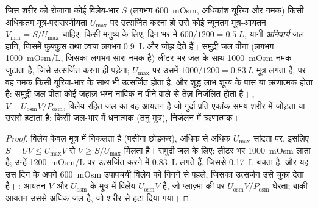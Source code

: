 \begin{proposition}[जल का अंकगणित]\label{prop:b3:renal-osmoregulation:water}
जिस शरीर को रोज़ाना कोई विलेय-भार $S$ (लगभग \qty{600}{mOsm}, अधिकांश
यूरिया और नमक) किसी अधिकतम मूत्र-परासरणीयता $U_{\max}$ पर उत्सर्जित
करना हो उसे कोई न्यूनतम मूत्र-आयतन $V_{\min} = S/U_{\max}$ चाहिए: किसी
मनुष्य के लिए, दिन भर में $600/1200 = \qty{0.5}{L}$, यानी
\emph{अनिवार्य} जल-हानि, जिसमें फुफ्फुस तथा त्वचा लगभग \qty{0.9}{L} और
जोड़ देते हैं। समुद्री जल पीना (लगभग \qty{1000}{mOsm/L}, जिसका लगभग
सारा नमक है) लीटर भर जल के साथ \qty{1000}{mOsm} नमक जुटाता है, जिसे
उत्सर्जित करना ही पड़ेगा; $U_{\max}$ पर उसमें
$1000/1200 = \qty{0.83}{L}$ मूत्र लगता है, पर वह नमक किसी यूरिया-भार के
साथ भी उत्सर्जित होता है, और शुद्ध लाभ शून्य के पास या ऋणात्मक होता है:
समुद्री जल पीता कोई जहाज़-भग्न नाविक न पीने वाले से तेज़ निर्जलित होता
है। \emph{}, $V - U_{\text{osm}}V/P_{\text{osm}}$,
विलेय-रहित जल का वह आयतन है जो गुर्दा प्रति एकांक समय शरीर में जोड़ता
या उससे हटाता है: किसी जल-भार में धनात्मक (तनु मूत्र), निर्जलन में
ऋणात्मक।
\end{proposition}
\begin{proof}
विलेय केवल मूत्र में निकलता है (पसीना छोड़कर), अधिक से अधिक
$U_{\max}$ सांद्रता पर, इसलिए $S = U V \le U_{\max}V$ से
$V \ge S/U_{\max}$ मिलता है। समुद्री जल के लिए: लीटर भर
\qty{1000}{mOsm} लाता है; उन्हें \qty{1200}{mOsm/L} पर उत्सर्जित करने
में \qty{0.83}{L} लगते हैं, जिससे \qty{0.17}{L} बचता है, और यह उस दिन
के अपने \qty{600}{mOsm} उपापचयी विलेय को गिनने से पहले, जिसका उत्सर्जन
उसे चुका देता है। : आयतन $V$ और 
$U_{\text{osm}}$ के मूत्र में विलेय $U_{\text{osm}}V$ है, जो प्लाज़्मा
की  पर $U_{\text{osm}}V/P_{\text{osm}}$ घेरता; बाकी आयतन उससे
अधिक जल है, जो शरीर से हटा दिया गया।
\end{proof}


